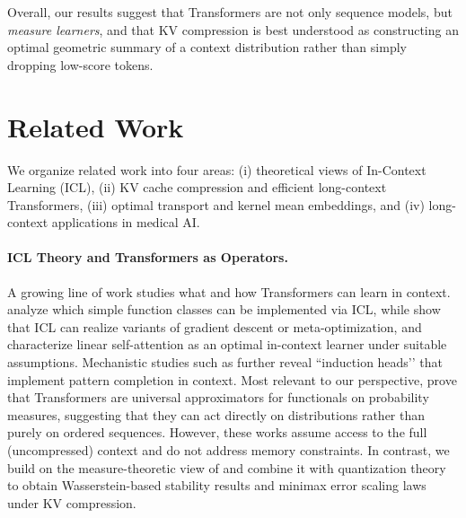 \documentclass{article}
\theoremstyle{plain}
\theoremstyle{definition}
\theoremstyle{remark}
\begin{document}
Overall, our results suggest that Transformers are not only sequence models, but \emph{measure learners}, and that KV compression is best understood as constructing an optimal geometric summary of a context distribution rather than simply dropping low-score tokens.

\section{Related Work}
\label{sec:related}

We organize related work into four areas: (i) theoretical views of In-Context Learning (ICL),  
(ii) KV cache compression and efficient long-context Transformers, (iii) optimal transport and  
kernel mean embeddings, and (iv) long-context applications in medical AI.

\paragraph{ICL Theory and Transformers as Operators.}
A growing line of work studies what and how Transformers can learn in context.  
\citet{garg2022what} analyze which simple function classes can be implemented via ICL,  
while \citet{akyurek2022learning,von2023transformers,dai2022why} show that ICL can  
realize variants of gradient descent or meta-optimization, and  
\citet{ahn2024transformers,mahankali2024one} characterize linear self-attention as an  
optimal in-context learner under suitable assumptions.  
Mechanistic studies such as \citet{olsson2022context} further reveal “induction heads’’  
that implement pattern completion in context.  
Most relevant to our perspective, \citet{furuya2025transformers} prove that Transformers  
are universal approximators for functionals on probability measures, suggesting that  
they can act directly on distributions rather than purely on ordered sequences.  
However, these works assume access to the full (uncompressed) context and do not  
address memory constraints.  
In contrast, we build on the measure-theoretic view of \citet{furuya2025transformers}  
and combine it with quantization theory to obtain Wasserstein-based stability results  
and minimax error scaling laws under KV compression.
\end{document}
